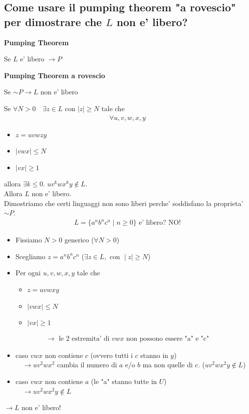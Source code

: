 \documentclass[a4paper,12pt]{article}
\begin{document}
{\subsection*{Come usare il pumping theorem "a rovescio" per dimostrare che $L$ non e' libero?}
\textbf{Pumping Theorem}
\begin{center}
  Se $L$ e' libero $\to P$
\end{center}
\textbf{Pumping Theorem a rovescio}
\begin{center}
  Se $\sim P \to L$ non e' libero
\end{center}
\vspace{1em}
Se $\forall N > 0 \quad \exists z \in L $ con $\mid z \mid \geq N$ tale che 
\begin{align*}
  \forall u,v,w,x,y
\end{align*}
\begin{itemize}
  \item $z = uvwzy$
  \item $\mid vwx \mid \leq N$
  \item $\mid vx \mid \geq 1$
\end{itemize}
allora $\exists k \leq 0$. $uv^kwx^ky \notin L$. \\
Allora $L$ non e' libero.
\vspace{2em} \\
Dimostriamo che certi linguaggi non sono liberi perche' soddisfano la proprieta' $\sim P$.
\begin{align*}
  L = \{a^n b^n c^n \mid n \geq 0\} \text{ e' libero? NO!}
\end{align*}
\begin{itemize}
  \item Fissiamo $N > 0$ generico ($\forall N > 0$)
  \item Scegliamo $z = a^nb^nc^n$ ($\exists z \in L, \text{ con } \mid z \mid \geq N$)
  \item Per ogni $u,v,w,x,y$ tale che
  \begin{itemize}
    \item $z = uvwxy$
    \item $\mid vwx \mid \leq N$
    \item $\mid vx \mid \geq 1$
  \end{itemize}
\end{itemize}
\begin{align*}
  \to \text{ le 2 estremita' di $vwx$ non possono essere "a" e "c"}
\end{align*}
\begin{itemize}
  \item caso $vwx$ non contiene $c$ (ovvero tutti i $c$ stanno in $y$) \\
  $\quad \to uv^2wx^2$ cambia il numero di $a$ e/o $b$ ma non quelle di $c$.  ($uv^2wx^2y \notin L$)
  \item caso $vwx$ non contiene $a$ (le "a" stanno tutte in $U$) \\
  $\quad \to uv^2wx^2y \notin L$
\end{itemize}
$\to L$ non e' libero!
\vspace{2em} \\
}
\end{document}
